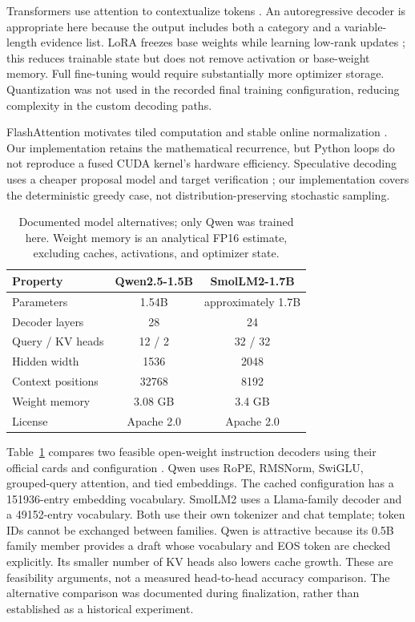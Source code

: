 \documentclass[conference]{IEEEtran}
\begin{document}
Transformers use attention to contextualize tokens \cite{attention}. An autoregressive decoder is appropriate here because the output includes both a category and a variable-length evidence list. LoRA freezes base weights while learning low-rank updates \cite{lora}; this reduces trainable state but does not remove activation or base-weight memory. Full fine-tuning would require substantially more optimizer storage. Quantization was not used in the recorded final training configuration, reducing complexity in the custom decoding paths.

FlashAttention motivates tiled computation and stable online normalization \cite{flash}. Our implementation retains the mathematical recurrence, but Python loops do not reproduce a fused CUDA kernel's hardware efficiency. Speculative decoding uses a cheaper proposal model and target verification \cite{spec}; our implementation covers the deterministic greedy case, not distribution-preserving stochastic sampling.

\begin{table}[t]
\caption{Documented model alternatives; only Qwen was trained here. Weight memory is an analytical FP16 estimate, excluding caches, activations, and optimizer state.}
\label{tab:models}\centering\small
\begin{tabular}{lcc}\toprule
Property & Qwen2.5-1.5B & SmolLM2-1.7B\\\midrule
Parameters & 1.54B & approximately 1.7B\\
Decoder layers & 28 & 24\\
Query / KV heads & 12 / 2 & 32 / 32\\
Hidden width & 1536 & 2048\\
Context positions & 32768 & 8192\\
Weight memory & 3.08 GB & 3.4 GB\\
License & Apache 2.0 & Apache 2.0\\\bottomrule
\end{tabular}
\end{table}

Table~\ref{tab:models} compares two feasible open-weight instruction decoders using their official cards and configuration \cite{qwen,smol,smolconfig}. Qwen uses RoPE, RMSNorm, SwiGLU, grouped-query attention, and tied embeddings. The cached configuration has a 151936-entry embedding vocabulary. SmolLM2 uses a Llama-family decoder and a 49152-entry vocabulary. Both use their own tokenizer and chat template; token IDs cannot be exchanged between families. Qwen is attractive because its 0.5B family member provides a draft whose vocabulary and EOS token are checked explicitly. Its smaller number of KV heads also lowers cache growth. These are feasibility arguments, not a measured head-to-head accuracy comparison. The alternative comparison was documented during finalization, rather than established as a historical experiment.
\end{document}
